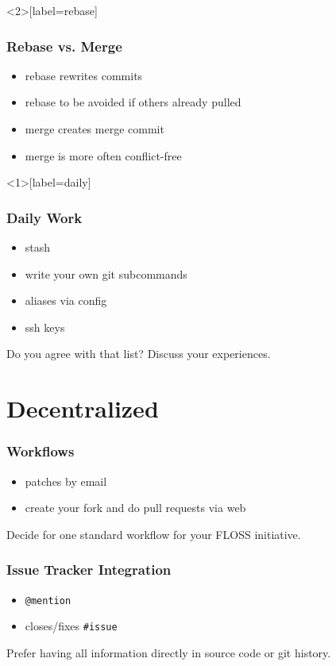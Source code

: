 \begin{frame}<2>[label=rebase]
	\frametitle{Rebase vs. Merge}

	\pause

	\begin{itemize}
		\item rebase rewrites commits
		\item rebase to be avoided if others already pulled
		\item merge creates merge commit
		\item merge is more often conflict-free
	\end{itemize}
\end{frame}

\begin{frame}<1>[label=daily]
	\frametitle{Daily Work}

	\begin{itemize}
		\item stash
		\item write your own git subcommands
		\item aliases via config
		\item ssh keys
	\end{itemize}

	\pause \pause

	\begin{task}
	Do you agree with that list?
	Discuss your experiences.
	\end{task}
\end{frame}


\section{Decentralized}

\begin{frame}
	\frametitle{Workflows}

	\begin{itemize}
		\item patches by email
		\item create your fork and do pull requests via web
	\end{itemize}

	\begin{finding}
	Decide for one standard workflow for your FLOSS initiative.
	\end{finding}
\end{frame}

\begin{frame}[fragile]
	\frametitle{Issue Tracker Integration}

	\begin{itemize}
		\item \verb+@mention+
		\item closes/fixes \verb+#issue+
	\end{itemize}

	\begin{finding}
	Prefer having all information directly in source code or git history.
	\end{finding}
\end{frame}


